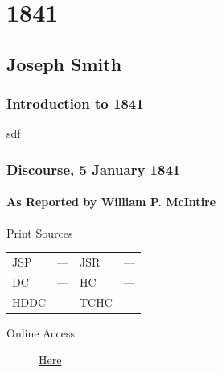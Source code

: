 \section{1841}

	\subsection{Joseph Smith}
		\label{EMS-1841-JS}

		\subsubsection{Introduction to 1841}
		
			sdf
			
		\subsubsection{Discourse, 5 January 1841}
			\label{EMS-1841-JS-5-JAN-1841}
			
			\paragraph{As Reported by William P. McIntire}
				\label{EMS-1841-JS-5-JAN-1841-WM}
			
				\begin{description}
					\item[Print Sources]
				\end{description}

				\begin{tabular}{p{0.5in}p{1in}p{0.5in}p{1in}}
					JSP	 	& ---		& JSR 		& --- \\
					DC	 	& ---		& HC 		& --- \\
					HDDC 	& ---		& TCHC 		& --- \\
				\end{tabular}
				
				\begin{description}
					\item[Online Access] \href{https://www.josephsmithpapers.org/paper-summary/account-of-meeting-and-discourse-5-january-1841-as-reported-by-william-p-mcintire/}{Here}
				\end{description}
				
